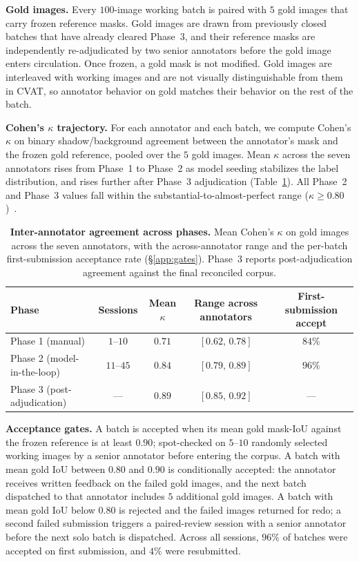 \textbf{Gold images.} Every $100$-image working batch is paired with
$5$ gold images that carry frozen reference masks. Gold images are
drawn from previously closed batches that have already cleared
Phase~3, and their reference masks are independently re-adjudicated
by two senior annotators before the gold image enters circulation.
Once frozen, a gold mask is not modified. Gold images are interleaved
with working images and are not visually distinguishable from them in
CVAT, so annotator behavior on gold matches their behavior on the rest
of the batch.

\textbf{Cohen's $\kappa$ trajectory.} For each annotator and each
batch, we compute Cohen's $\kappa$ on binary shadow/background
agreement between the annotator's mask and the frozen gold reference,
pooled over the $5$ gold images. Mean $\kappa$ across the seven
annotators rises from Phase~1 to Phase~2 as model seeding stabilizes
the label distribution, and rises further after Phase~3 adjudication
(Table~\ref{tab:kappa}). All Phase~2 and Phase~3 values fall within the
substantial-to-almost-perfect range
($\kappa\!\geq\!0.80$)~\cite{landis1977measurement}.

\begin{table}[h]
  \centering
  \small
  \setlength{\tabcolsep}{6pt}
  \caption{
    \textbf{Inter-annotator agreement across phases.}
    Mean Cohen's $\kappa$ on gold images across the seven annotators,
    with the across-annotator range and the per-batch first-submission
    acceptance rate (\S\ref{app:gates}). Phase~3 reports
    post-adjudication agreement against the final reconciled corpus.
  }
  \label{tab:kappa}
  \begin{tabular}{@{}lcccc@{}}
    \toprule
    \textbf{Phase} & \textbf{Sessions} & \textbf{Mean $\kappa$} & \textbf{Range across annotators} & \textbf{First-submission accept} \\
    \midrule
    Phase 1 (manual)            & $1\text{--}10$  & $0.71$ & $[0.62,\,0.78]$ & $84\%$ \\
    Phase 2 (model-in-the-loop) & $11\text{--}45$ & $0.84$ & $[0.79,\,0.89]$ & $96\%$ \\
    Phase 3 (post-adjudication) & ---                   & $0.89$ & $[0.85,\,0.92]$ & --- \\
    \bottomrule
  \end{tabular}
\end{table}

\textbf{Acceptance gates.}
\label{app:gates}
A batch is accepted when its mean gold mask-IoU against the frozen
reference is at least $0.90$; spot-checked on $5$--$10$ randomly
selected working images by a senior annotator before entering the
corpus. A batch with mean gold IoU between $0.80$ and $0.90$ is
conditionally accepted: the annotator receives written feedback on the
failed gold images, and the next batch dispatched to that annotator
includes $5$ additional gold images. A batch with mean gold IoU below
$0.80$ is rejected and the failed images returned for redo; a second
failed submission triggers a paired-review session with a senior
annotator before the next solo batch is dispatched. Across all
sessions, $96\%$ of batches were accepted on first submission, and
$4\%$ were resubmitted.

